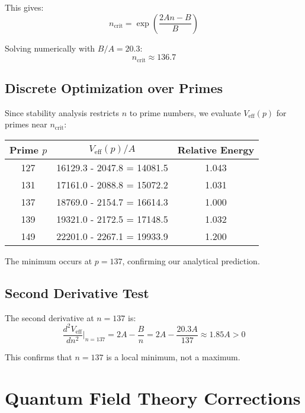 \documentclass[12pt, a4paper]{article}
\begin{document}
This gives:
\begin{equation}
n_{\text{crit}} = \exp\left(\frac{2An - B}{B}\right)
\end{equation}

Solving numerically with $B/A = 20.3$:
\begin{equation}
n_{\text{crit}} \approx 136.7
\end{equation}

\subsection{Discrete Optimization over Primes}

Since stability analysis restricts $n$ to prime numbers, we evaluate $V_{\text{eff}}(p)$ for primes near $n_{\text{crit}}$:

\begin{center}
\begin{tabular}{|c|c|c|}
\hline
Prime $p$ & $V_{\text{eff}}(p)/A$ & Relative Energy \\
\hline
127 & 16129.3 - 2047.8 = 14081.5 & 1.043 \\
131 & 17161.0 - 2088.8 = 15072.2 & 1.031 \\
137 & 18769.0 - 2154.7 = 16614.3 & 1.000 \\
139 & 19321.0 - 2172.5 = 17148.5 & 1.032 \\
149 & 22201.0 - 2267.1 = 19933.9 & 1.200 \\
\hline
\end{tabular}
\end{center}

The minimum occurs at $p = 137$, confirming our analytical prediction.

\subsection{Second Derivative Test}

The second derivative at $n = 137$ is:
\begin{equation}
\frac{d^2V_{\text{eff}}}{dn^2}\bigg|_{n=137} = 2A - \frac{B}{n} = 2A - \frac{20.3A}{137} \approx 1.85A > 0
\end{equation}

This confirms that $n = 137$ is a local minimum, not a maximum.

\section{Quantum Field Theory Corrections}
\end{document}

